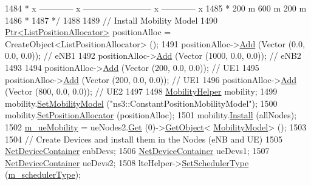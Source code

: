 \begin{DoxyCode}
1484 \textcolor{comment}{   *    x ------------ x ------------------------ x ------------ x}
1485 \textcolor{comment}{   *         200 m               600 m                  200 m}
1486 \textcolor{comment}{   *}
1487 \textcolor{comment}{   */}
1488 
1489   \textcolor{comment}{// Install Mobility Model}
1490   \hyperlink{classns3_1_1Ptr}{Ptr<ListPositionAllocator>} positionAlloc = CreateObject<ListPositionAllocator> 
      ();
1491   positionAlloc->\hyperlink{classns3_1_1ListPositionAllocator_a460e82f015ac012a73ba0ea0cccb3486}{Add} (Vector (0.0, 0.0, 0.0));                  \textcolor{comment}{// eNB1}
1492   positionAlloc->\hyperlink{classns3_1_1ListPositionAllocator_a460e82f015ac012a73ba0ea0cccb3486}{Add} (Vector (1000,  0.0, 0.0));                \textcolor{comment}{// eNB2}
1493 
1494   positionAlloc->\hyperlink{classns3_1_1ListPositionAllocator_a460e82f015ac012a73ba0ea0cccb3486}{Add} (Vector (200, 0.0, 0.0));                  \textcolor{comment}{// UE1}
1495   positionAlloc->\hyperlink{classns3_1_1ListPositionAllocator_a460e82f015ac012a73ba0ea0cccb3486}{Add} (Vector (200, 0.0, 0.0));                  \textcolor{comment}{// UE1}
1496   positionAlloc->\hyperlink{classns3_1_1ListPositionAllocator_a460e82f015ac012a73ba0ea0cccb3486}{Add} (Vector (800, 0.0, 0.0));                  \textcolor{comment}{// UE2}
1497 
1498   \hyperlink{classns3_1_1MobilityHelper}{MobilityHelper} mobility;
1499   mobility.\hyperlink{classns3_1_1MobilityHelper_a030275011b6f40682e70534d30280aba}{SetMobilityModel} (\textcolor{stringliteral}{"ns3::ConstantPositionMobilityModel"});
1500   mobility.\hyperlink{classns3_1_1MobilityHelper_ac59d5295076be3cc11021566713a28c5}{SetPositionAllocator} (positionAlloc);
1501   mobility.\hyperlink{classns3_1_1MobilityHelper_a07737960ee95c0777109cf2994dd97ae}{Install} (allNodes);
1502   \hyperlink{classLteFrAreaTestCase_ae2f235fc4d87154ef9f32bc0d92ef2ca}{m\_ueMobility} = ueNodes2.\hyperlink{classns3_1_1NodeContainer_a9ed96e2ecc22e0f5a3d4842eb9bf90bf}{Get} (0)->\hyperlink{classns3_1_1Object_a13e18c00017096c8381eb651d5bd0783}{GetObject}<
      \hyperlink{classns3_1_1MobilityModel}{MobilityModel}> ();
1503 
1504   \textcolor{comment}{// Create Devices and install them in the Nodes (eNB and UE)}
1505   \hyperlink{classns3_1_1NetDeviceContainer}{NetDeviceContainer} enbDevs;
1506   \hyperlink{classns3_1_1NetDeviceContainer}{NetDeviceContainer} ueDevs1;
1507   \hyperlink{classns3_1_1NetDeviceContainer}{NetDeviceContainer} ueDevs2;
1508   lteHelper->\hyperlink{classns3_1_1LteHelper_a8f86e55b8b80a81732c4b2df00fb25d5}{SetSchedulerType} (\hyperlink{classLteFrAreaTestCase_aa093fda7c4b63732d547c87952f52f05}{m\_schedulerType});

\end{DoxyCode}
